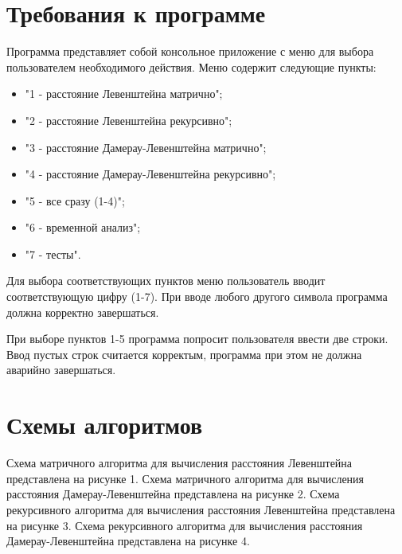 \documentclass[14pt]{report}
\begin{document}
\section*{Требования к программе}
Программа представляет собой консольное приложение с меню для выбора пользователем необходимого действия.
Меню содержит следующие пункты:
\begin{itemize}
	\item "1 - расстояние Левенштейна матрично";
	\item "2 - расстояние Левенштейна рекурсивно";
	\item "3 - расстояние Дамерау-Левенштейна матрично";
	\item "4 - расстояние Дамерау-Левенштейна рекурсивно";
	\item "5 - все сразу (1-4)";
	\item "6 - временной анализ";
	\item "7 - тесты".
\end{itemize}

Для выбора соответствующих пунктов меню пользователь вводит соответствующую цифру (1-7). При вводе любого другого символа программа должна корректно завершаться.

При выборе пунктов 1-5 программа попросит пользователя ввести две строки. Ввод пустых строк считается корректым, программа при этом не должна аварийно завершаться.

\section*{Схемы алгоритмов}

Схема матричного алгоритма для вычисления расстояния Левенштейна представлена на рисунке 1. Схема матричного алгоритма для вычисления расстояния Дамерау-Левенштейна представлена на рисунке 2.
Схема рекурсивного алгоритма для вычисления расстояния Левенштейна представлена на рисунке 3. Схема рекурсивного алгоритма для вычисления расстояния Дамерау-Левенштейна представлена на рисунке 4.
\end{document}
